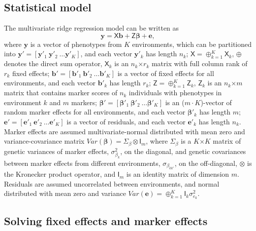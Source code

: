 \documentclass{bmcart}
\newcommand{\vecx}{\boldsymbol}
\newcommand{\mat}[1]{\boldsymbol{\mathsf{#1}}}
\begin{document}
\subsection{Statistical model\label{StatModel}}

The multivariate ridge regression model can be written as
\begin{equation}\label{eqn:StatModel}
\vecx{y} = \mat{X}\vecx{b} + \mat{Z}\vecx{\beta} + \vecx{e},
\end{equation}
where $\vecx{y}$ is a vector of phenotypes from $K$ environments, which can be partitioned into $\vecx{y}' = [\vecx{y}'_1 ~ \vecx{y}'_2 ~ \hdots \vecx{y}'_K]$, and each vector $\vecx{y}'_k$ has length $n_k$;
$\mat{X} = \oplus_{k=1}^{K}\mat{X}_k$, $\oplus$ denotes the direct sum operator, $\mat{X}_k$ is an $n_k$$\times$$r_k$ matrix with full column rank of $r_k$ fixed effects; $\vecx{b}' = [\vecx{b}'_1 ~ \vecx{b}'_2 ~ \hdots \vecx{b}'_K]$ is a vector of fixed effects for all environments, and each vector $\vecx{b}'_k$ has length $r_k$;
$\mat{Z} = \oplus_{k=1}^{K}\mat{Z}_k$, $\mat{Z}_k$ is an $n_k$$\times$$m$ matrix that contains marker scores of $n_k$ individuals with phenotypes in environment $k$ and $m$ markers; $\vecx{\beta}' = [\vecx{\beta}'_1 ~ \vecx{\beta}'_2 ~ \hdots \vecx{\beta}'_K]$ is an ($m\cdot K$)-vector of random marker effects for all environments, and each vector $\vecx{\beta}'_k$ has length $m$; $\vecx{e}' = [\vecx{e}'_1 ~ \vecx{e}'_2 ~ \hdots \vecx{e}'_K]$ is a vector of residuals, and each vector $\vecx{e}'_k$ has length $n_k$. 
Marker effects are assumed multivariate-normal distributed with mean zero and variance-covariance matrix $Var(\vecx{\beta}) = \mat{\Sigma}_{\beta}\otimes\mat{I}_{m}$, where $\mat{\Sigma}_{\beta}$ is a $K$$\times$$K$ matrix of genetic variances of marker effects, $\sigma^2_{\beta_k}$, on the diagonal, and genetic covariances between marker effects from different environments, $\sigma_{\beta_{kk'}}$, on the off-diagonal, $\otimes$ is the Kronecker product operator, and $\mat{I}_m$ is an identity matrix of dimension $m$. Residuals are assumed uncorrelated between environments, and normal distributed with mean zero and variance $Var(\vecx{e}) = \oplus_{k=1}^K\mat{I}_k\sigma^2_{e_k}$.

\subsection{Solving fixed effects and marker effects}
\end{document}
